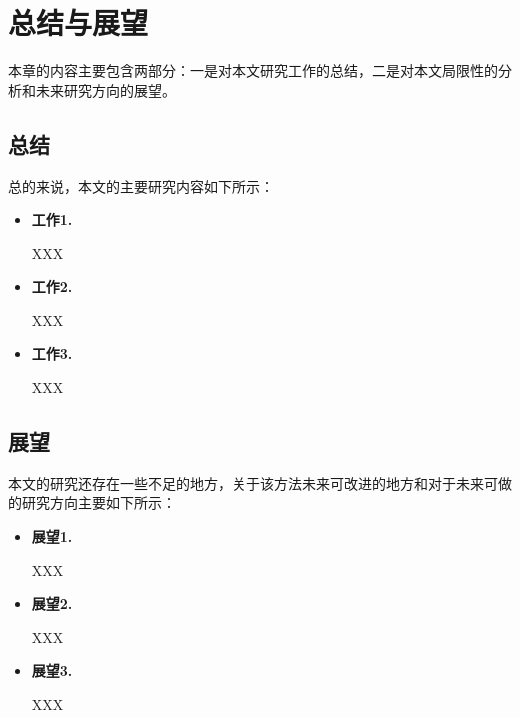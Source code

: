 \newpage
\setcounter{table}{0}
\setcounter{figure}{0}
\section{总结与展望}

本章的内容主要包含两部分：一是对本文研究工作的总结，二是对本文局限性的分析和未来研究方向的展望。


\subsection{总结}\label{summarize}





总的来说，本文的主要研究内容如下所示：
\begin{itemize}
	\item[(1)]  \textbf{工作1.}
	
    XXX
	
	
	\item[(2)] \textbf{工作2.}
	
    XXX
	
	\item[(3)] \textbf{工作3.}

    XXX
	
	
\end{itemize}


\subsection{展望}\label{future}
本文的研究还存在一些不足的地方，关于该方法未来可改进的地方和对于未来可做的研究方向主要如下所示：

\begin{itemize}
	\item[(1)]  \textbf{展望1.}
	
    XXX
	
	
	\item[(2)] \textbf{展望2.}
	
    XXX
	
	
	\item[(3)] \textbf{展望3.}
	
    XXX
	
	
	
\end{itemize}

